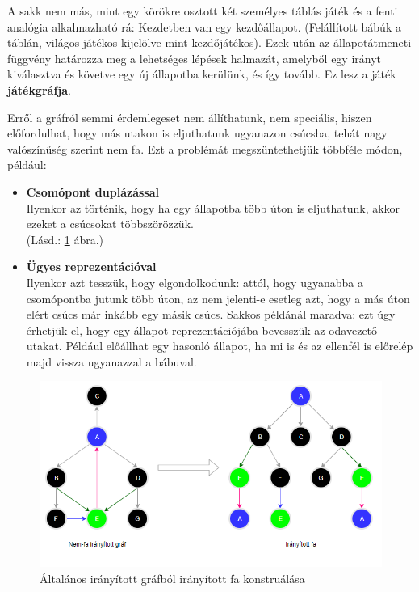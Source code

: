 \documentclass[twoside, a4paper, 12pt]{article}
\begin{document}
A sakk nem más, mint egy körökre osztott két személyes táblás játék és a fenti analógia alkalmazható rá: Kezdetben van egy kezdőállapot. (Felállított bábúk a táblán, világos játékos kijelölve mint kezdőjátékos). Ezek után az állapotátmeneti függvény határozza meg a lehetséges lépések halmazát, amelyből egy irányt kiválasztva és követve egy új állapotba kerülünk, és így tovább. Ez lesz a játék \textbf{játékgráfja}.

Erről a gráfról semmi érdemlegeset nem állíthatunk, nem speciális, hiszen előfordulhat, hogy más utakon is eljuthatunk ugyanazon csúcsba, tehát nagy valószínűség szerint nem fa. Ezt a problémát megszüntethetjük többféle módon, például: 

\begin{itemize}
	\item \textbf{Csomópont duplázással} \\
	Ilyenkor az történik, hogy ha egy állapotba több úton is eljuthatunk, akkor ezeket a csúcsokat többszörözzük. \\
	(Lásd.: \ref{fig:game-graph-transformation} ábra.)
	
	\item \textbf{Ügyes reprezentációval} \\
	Ilyenkor azt tesszük, hogy elgondolkodunk: attól, hogy ugyanabba a csomópontba jutunk több úton, az nem jelenti-e esetleg azt, hogy a más úton elért csúcs már inkább egy másik csúcs. Sakkos példánál maradva: ezt úgy érhetjük el, hogy egy állapot reprezentációjába bevesszük az odavezető utakat. Például előállhat egy hasonló állapot, ha mi is és az ellenfél is előrelép majd vissza ugyanazzal a bábuval.
\end{itemize}

\begin{figure}[htbp]
	\centering
	\includegraphics[width=1.0\textwidth]{img/game-graph-transformation.png}
	\caption{Általános irányított gráfból irányított fa konstruálása}
	\label{fig:game-graph-transformation}
\end{figure}
\end{document}
